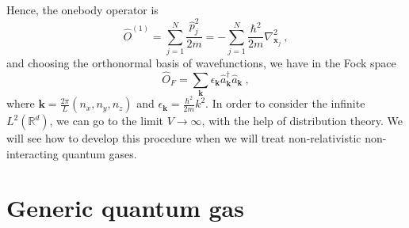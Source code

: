     Hence, the onebody operator is 
    \begin{equation*}
        \hat O^{(1)} = \sum_{j=1}^{N} \frac{\hat p^2_j}{2m} = - \sum_{j=1}^{N} \frac{\hbar^2}{2m} \nabla^2_{\mathbf x_j} ~,
    \end{equation*}
    and choosing the orthonormal basis of wavefunctions, we have in the Fock space 
    \begin{equation*}
        \hat O_F = \sum_{\mathbf k} \epsilon_{\mathbf k} \hat a^\dagger_{\mathbf k} \hat a_{\mathbf k} ~,
    \end{equation*}
    where $\mathbf k = \frac{2\pi}{L} (n_x, n_y, n_z)$ and $\epsilon_{\mathbf k} = \frac{\hbar^2}{2m} k^2$. In order to consider the infinite $L^2 (\mathbb R^d)$, we can go to the limit $V \rightarrow \infty$, with the help of distribution theory. We will see how to develop this procedure when we will treat non-relativistic non-interacting quantum gases.
    
\section{Generic quantum gas}

